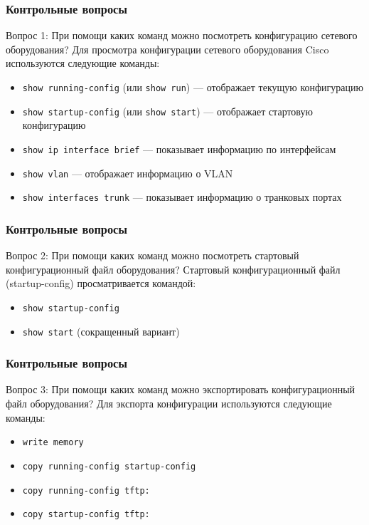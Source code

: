 \begin{frame}
\frametitle{Контрольные вопросы}

\begin{block}{Вопрос 1: При помощи каких команд можно посмотреть конфигурацию сетевого оборудования?}
Для просмотра конфигурации сетевого оборудования Cisco используются следующие команды:
\begin{itemize}
    \item \texttt{show running-config} (или \texttt{show run}) — отображает текущую конфигурацию
    \item \texttt{show startup-config} (или \texttt{show start}) — отображает стартовую конфигурацию
    \item \texttt{show ip interface brief} — показывает информацию по интерфейсам
    \item \texttt{show vlan} — отображает информацию о VLAN
    \item \texttt{show interfaces trunk} — показывает информацию о транковых портах
\end{itemize}
\end{block}
\end{frame}

\begin{frame}
\frametitle{Контрольные вопросы}

\begin{block}{Вопрос 2: При помощи каких команд можно посмотреть стартовый конфигурационный файл оборудования?}
Стартовый конфигурационный файл (startup-config) просматривается командой:
\begin{itemize}
    \item \texttt{show startup-config}
    \item \texttt{show start} (сокращенный вариант)
\end{itemize}
\end{block}
\end{frame}

\begin{frame}
\frametitle{Контрольные вопросы}

\begin{block}{Вопрос 3: При помощи каких команд можно экспортировать конфигурационный файл оборудования?}
Для экспорта конфигурации используются следующие команды:
\begin{itemize}
    \item \texttt{write memory}
    \item \texttt{copy running-config startup-config}
    \item \texttt{copy running-config tftp:}
    \item \texttt{copy startup-config tftp:}
\end{itemize}
\end{block}
\end{frame}


